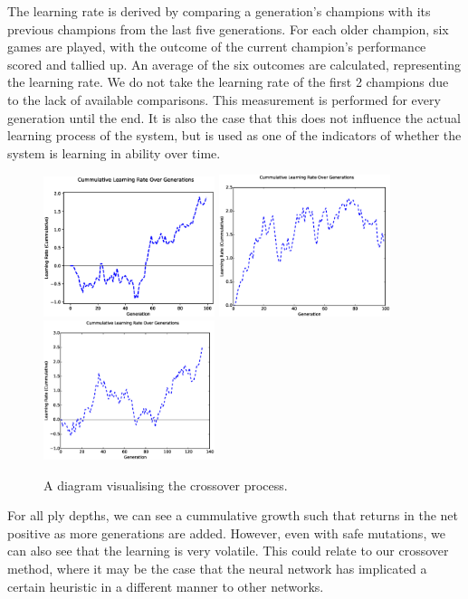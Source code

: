 \documentclass[12pt,a4paper]{article}
\begin{document}
    The learning rate is derived by comparing a generation's champions with its previous champions from the last five generations. For each older champion, six games are played, with the outcome of the current champion's performance scored and tallied up. An average of the six outcomes are calculated, representing the learning rate. We do not take the learning rate of the first 2 champions due to the lack of available comparisons. This measurement is performed for every generation until the end. It is also the case that this does not influence the actual learning process of the system, but is used as one of the indicators of whether the system is learning in ability over time.
    
    \begin{figure}[!h]
        \centering
        \includegraphics[width=50mm]{images/results/1ply/cummulative_growth.eps}
        \includegraphics[width=50mm]{images/results/3ply/cummulative_growth.eps}
        \includegraphics[width=50mm]{images/results/6ply/cummulative_growth.eps}
        \caption{A diagram visualising the crossover process.\label{crossoverpic}}
    \end{figure}
    
    For all ply depths, we can see a cummulative growth such that returns in the net positive as more generations are added. However, even with safe mutations, we can also see that the learning is very volatile. This could relate to our crossover method, where it may be the case that the neural network has implicated a certain heuristic in a different manner to other networks. 
    
\end{document}

